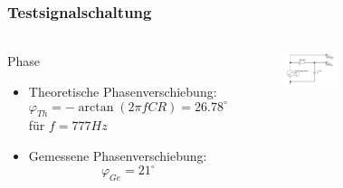 \begin{frame}
\frametitle{Testsignalschaltung}
\framesubtitle{}
\begin{columns}[c]
         \begin{block}{Phase}
                 \begin{itemize}
                     \item Theoretische Phasenverschiebung:
                         \begin{equation*}
                             \varphi_{Th} = -\arctan{\left(2\pi f C R\right)} = 26.78^{\circ} 
                         \end{equation*}
                             für $f = 777Hz$
                    \item Gemessene Phasenverschiebung:
                        \begin{equation*}
                            \varphi_{Ge} = 21^{\circ}
                        \end{equation*}
                 \end{itemize}
         \end{block}
        \begin{figure}[H]
        \begin{center}
                \includegraphics[scale=0.3]{./img/schaltung/testsignal.png}
        \end{center}
        \end{figure}
        \begin{figure}[H]
        \begin{center}

\end{center}
\end{figure}
\end{columns}
\end{frame}
